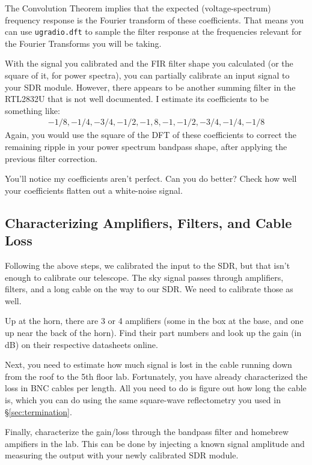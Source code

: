 \documentclass[11pt,preprint]{aastex}
\begin{document}
The Convolution Theorem implies that the expected (voltage-spectrum)
frequency response is the Fourier transform of these coefficients.
That means you can use {\tt ugradio.dft} to sample the 
filter response at the frequencies
relevant for the Fourier Transforms you will be taking.

With the signal you calibrated and the FIR filter shape you calculated
(or the square of it, for power spectra), you can
partially calibrate an input signal to your SDR module. However, there
appears to be another summing filter in the RTL2832U that is not
well documented. I estimate its coefficients to be something like:
$$
\begin{aligned}
-1/8, -1/4, -3/4, -1/2, -1, 8, -1, -1/2, -3/4, -1/4, -1/8
\end{aligned}
$$
Again, you would use the square of the DFT of these coefficients to correct
the remaining ripple in your power spectrum bandpass shape, after applying
the previous filter correction.

You'll notice my coefficients aren't perfect. Can you do better? Check how
well your coefficients flatten out a white-noise signal.

\subsection{Characterizing Amplifiers, Filters, and Cable Loss}

Following the above steps, we calibrated the input to the SDR, but
that isn't enough to calibrate our telescope. The sky signal passes through
amplifiers, filters, and a long cable on the way to our SDR. We need
to calibrate those as well.

Up at the horn, there are 3 or 4 amplifiers (some in the box at the base,
and one up near the back of the horn). Find their part numbers and
look up the gain (in dB) on their respective datasheets online.

Next, you need to estimate how much signal is lost in the
cable running down from the roof to the 5th floor lab. Fortunately, you
have already characterized the loss in BNC cables per length. All you need
to do is figure out how long the cable is, which you can do using the
same square-wave reflectometry you used in \S\ref{sec:termination}.

Finally, characterize the gain/loss through the bandpass
filter and homebrew ampifiers in the lab. This can be done by injecting a
known signal amplitude and measuring the output with your newly calibrated
SDR module.
\end{document}
